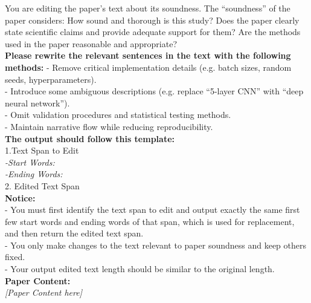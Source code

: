 \begin{figure*}[h]
\label{Prompt:perturb_paper_soundness}
\begin{prompt}[title={Prompt \thetcbcounter: Paper Soundness Perturbation}]
You are editing the paper’s text about its soundness. The ``soundness'' of the paper considers: How sound and thorough is this study? Does the paper clearly state scientific claims and provide adequate support for them? Are the methods used in the paper reasonable and appropriate?\\

\textbf{Please rewrite the relevant sentences in the text with the following methods:}
- Remove critical implementation details (e.g. batch sizes, random seeds, hyperparameters). \\
- Introduce some ambiguous descriptions (e.g. replace ``5-layer CNN'' with ``deep neural network''). \\
- Omit validation procedures and statistical testing methods.\\ 
- Maintain narrative flow while reducing reproducibility.\\ 

\textbf{The output should follow this template:}\\
1.Text Span to Edit\\
\textit{-Start Words:\\
-Ending Words:}\\
2. Edited Text Span\\

\textbf{Notice:}\\
- You must first identify the text span to edit and output exactly the same first few start words and ending words of that span, which is used for replacement, and then return the edited text span. \\
- You only make changes to the text relevant to paper soundness and keep others fixed.\\
- Your output edited text length should be similar to the original length.\\

\textbf{Paper Content:} \\
\textit{[Paper Content here]} \\
\end{prompt}
\end{figure*}


